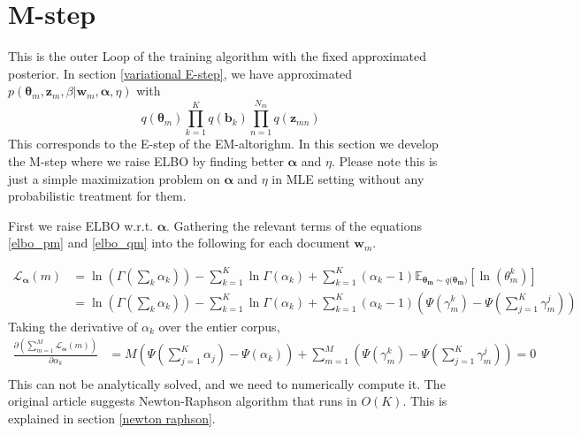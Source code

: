 \documentclass[a4]{article}
\begin{document}


\section{M-step}
This is the outer Loop of the training algorithm with the fixed approximated posterior.
In section \ref{variational E-step}, we have approximated 
$p( \bm{\theta}_m, \mathbf{z}_{m}, \beta | \mathbf{w}_m, \bm{\alpha}, \eta )$
with
\begin{equation}
q( \bm{\theta}_m )\prod_{k=1}^{K} q( \mathbf{b}_k )\prod_{n = 1}^{N_m} q( \mathbf{z}_{mn} )\label{q_forEM}
\end{equation}
This corresponds to the E-step of the EM-altorighm.
In this section we develop the M-step where we raise ELBO by
finding better $\bm{\alpha}$ and $\eta$.
Please note this is just a simple maximization problem on $\bm{\alpha}$ and $\eta$ in MLE setting
without any probabilistic treatment for them.

First we raise ELBO w.r.t. $\bm{\alpha}$. Gathering the relevant terms of the equations \ref{elbo_pm} and \ref{elbo_qm}
into the following for each document $\mathbf{w}_m$.

\begin{equation}
\begin{aligned}
    \mathcal{L}_{\bm{\alpha}}(m)
    &=
      \ln \left( \Gamma( \sum_k \alpha_k ) \right) 
          - \sum_{k=1}^{K} \ln \Gamma(\alpha_k) 
          + \sum_{k=1}^{K} (\alpha_k - 1)
            \mathbb{E}_{\bm{\theta_m} \sim q(\bm{\theta_m)}}[\ln(\theta_m^k)]\\
    &=
      \ln \left( \Gamma( \sum_k \alpha_k ) \right) 
          - \sum_{k=1}^{K} \ln \Gamma(\alpha_k) 
          + \sum_{k=1}^{K} (\alpha_k - 1)
          \left(
            \Psi( \gamma_{m}^k ) - \Psi( \sum_{j=1}^{K} \gamma_{m}^j )
          \right)
\end{aligned}
\end{equation}
Taking the derivative of $\alpha_k$ over the entier corpus,
\begin{equation}
\begin{aligned}
    \frac{ \partial \left(\sum_{m=1}^M \mathcal{L}_{\bm{\alpha}}(m) \right) }
         { \partial\alpha_k }
    &=
      M \left( \Psi( \sum_{j=1}^{K} \alpha_j ) -
      \Psi(\alpha_k) \right) +
      \sum_{m=1}^M
      \left(
          \Psi( \gamma_{m}^k ) - \Psi( \sum_{j=1}^{K} \gamma_{m}^j )
      \right) = 0\label{derivative_alpha}\\
\end{aligned}
\end{equation}
This can not be analytically solved, and we need to numerically compute it.
The original article suggests Newton-Raphson algorithm that runs in $O(K)$.
This is explained in section \ref{newton raphson}.
\end{document}
